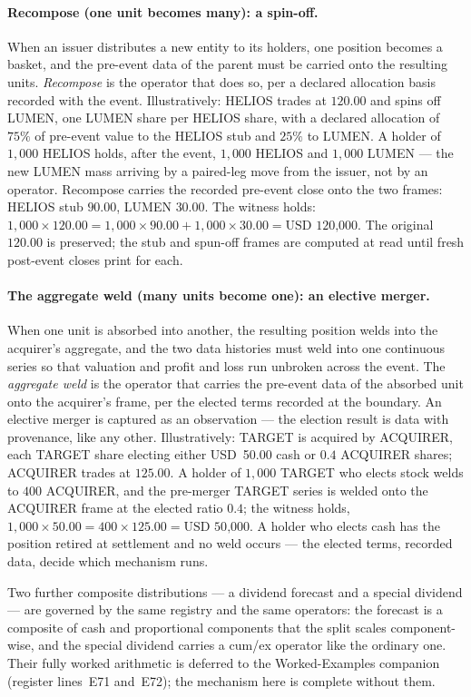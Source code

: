 \documentclass[11pt,a4paper]{article}
\newcommand{\USD}[1]{\mbox{USD~#1}}
\begin{document}
\paragraph{Recompose (one unit becomes many): a spin-off.}
When an issuer distributes a new entity to its holders, one position becomes a basket, and
the pre-event data of the parent must be carried onto the resulting units. \emph{Recompose}
is the operator that does so, per a declared allocation basis recorded with the event.
Illustratively: HELIOS trades at $120.00$ and spins off LUMEN, one LUMEN share per HELIOS
share, with a declared allocation of $75\%$ of pre-event value to the HELIOS stub and
$25\%$ to LUMEN. A holder of $1{,}000$ HELIOS holds, after the event, $1{,}000$ HELIOS and
$1{,}000$ LUMEN --- the new LUMEN mass arriving by a paired-leg move from the issuer, not by
an operator. Recompose carries the recorded pre-event close onto the two frames: HELIOS stub
$90.00$, LUMEN $30.00$. The witness holds: $1{,}000 \times 120.00 = 1{,}000 \times 90.00 +
1{,}000 \times 30.00 = \USD{120{,}000}$. The original $120.00$ is preserved; the stub and
spun-off frames are computed at read until fresh post-event closes print for each.

\paragraph{The aggregate weld (many units become one): an elective merger.}
When one unit is absorbed into another, the resulting position welds into the acquirer's
aggregate, and the two data histories must weld into one continuous series so that valuation
and profit and loss run unbroken across the event. The \emph{aggregate weld} is the operator
that carries the pre-event data of the absorbed unit onto the acquirer's frame, per the
elected terms recorded at the boundary. An elective merger is captured as an observation ---
the election result is data with provenance, like any other. Illustratively: TARGET is
acquired by ACQUIRER, each TARGET share electing either \USD{50.00} cash or $0.4$ ACQUIRER
shares; ACQUIRER trades at $125.00$. A holder of $1{,}000$ TARGET who elects stock welds to
$400$ ACQUIRER, and the pre-merger TARGET series is welded onto the ACQUIRER frame at the
elected ratio $0.4$; the witness holds, $1{,}000 \times 50.00 = 400 \times 125.00 =
\USD{50{,}000}$. A holder who elects cash has the position retired at settlement and no weld
occurs --- the elected terms, recorded data, decide which mechanism runs.

Two further composite distributions --- a dividend forecast and a special dividend --- are
governed by the same registry and the same operators: the forecast is a composite of cash
and proportional components that the split scales component-wise, and the special dividend
carries a cum/ex operator like the ordinary one. Their fully worked arithmetic is deferred
to the Worked-Examples companion (register lines~E71 and~E72); the mechanism here is
complete without them.
\end{document}
